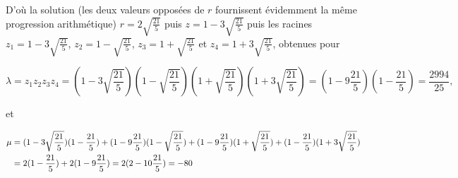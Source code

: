 {{D'où la solution (les deux valeurs opposées de $r$ fournissent évidemment la même progression arithmétique)
$r=2\sqrt{\frac{21}{5}}$ puis $z=1-3\sqrt{\frac{21}{5}}$ puis les racines $z_1=1-3\sqrt{\frac{21}{5}}$, $z_2=1-\sqrt{\frac{21}{5}}$, $z_3=1+\sqrt{\frac{21}{5}}$ et $z_4=1+3\sqrt{\frac{21}{5}}$, obtenues pour 

$$\lambda=z_1z_2z_3z_4=(1-3\sqrt{\frac{21}{5}})(1-\sqrt{\frac{21}{5}})(1+\sqrt{\frac{21}{5}})
(1+3\sqrt{\frac{21}{5}})= (1-9\frac{21}{5})(1-\frac{21}{5})=\frac{2994}{25},$$
 
et 

\begin{align*}\ensuremath
\mu&=(1-3\sqrt{\frac{21}{5}})(1-\frac{21}{5})+(1-9\frac{21}{5})(1-\sqrt{\frac{21}{5}})+(1-9\frac{21}{5})(1+\sqrt{\frac{21}{5}})+(1-\frac{21}{5})(1+3\sqrt{\frac{21}{5}})\\
 &=2(1-\frac{21}{5})+2(1-9\frac{21}{5})=2(2-10\frac{21}{5})=-80
\end{align*}}
}
